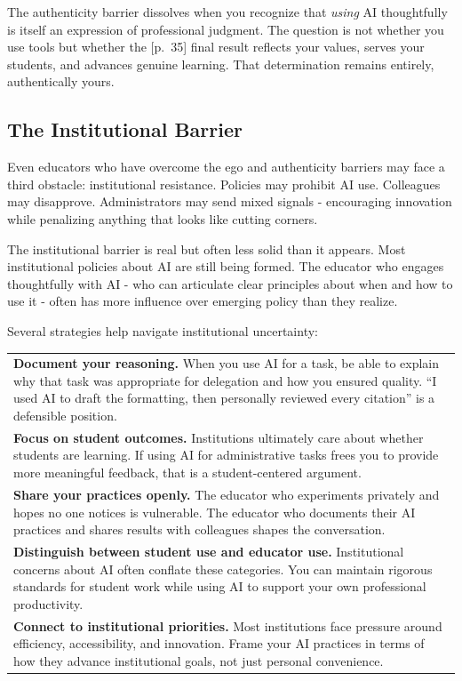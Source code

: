 \documentclass[
  letterpaper,
  DIV=11,
  numbers=noendperiod]{scrreprt}
\newcounter{none} %
\begin{document}
The authenticity barrier dissolves when you recognize that \emph{using}
AI thoughtfully is itself an expression of professional judgment. The
question is not whether you use tools but whether the {[}p.~35{]} final
result reflects your values, serves your students, and advances genuine
learning. That determination remains entirely, authentically yours.

\subsection{The Institutional Barrier}\label{the-institutional-barrier}

Even educators who have overcome the ego and authenticity barriers may
face a third obstacle: institutional resistance. Policies may prohibit
AI use. Colleagues may disapprove. Administrators may send mixed signals
- encouraging innovation while penalizing anything that looks like
cutting corners.

The institutional barrier is real but often less solid than it appears.
Most institutional policies about AI are still being formed. The
educator who engages thoughtfully with AI - who can articulate clear
principles about when and how to use it - often has more influence over
emerging policy than they realize.

Several strategies help navigate institutional uncertainty:

{\def\LTcaptype{none} %
\begin{longtable}[]{@{}
  >{\raggedright\arraybackslash}p{}@{}}
\toprule\noalign{}
\endhead
\bottomrule\noalign{}
\endlastfoot
\textbf{Document your reasoning.} When you use AI for a task, be able to
explain why that task was appropriate for delegation and how you ensured
quality. ``I used AI to draft the formatting, then personally reviewed
every citation'' is a defensible position. \\
\textbf{Focus on student outcomes.} Institutions ultimately care about
whether students are learning. If using AI for administrative tasks
frees you to provide more meaningful feedback, that is a
student-centered argument. \\
\textbf{Share your practices openly.} The educator who experiments
privately and hopes no one notices is vulnerable. The educator who
documents their AI practices and shares results with colleagues shapes
the conversation. \\
\textbf{Distinguish between student use and educator use.} Institutional
concerns about AI often conflate these categories. You can maintain
rigorous standards for student work while using AI to support your own
professional productivity. \\
\textbf{Connect to institutional priorities.} Most institutions face
pressure around efficiency, accessibility, and innovation. Frame your AI
practices in terms of how they advance institutional goals, not just
personal convenience. \\
\end{longtable}
}
\end{document}
